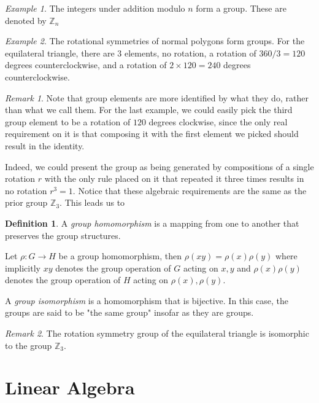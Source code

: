 \documentclass[12pt]{article}
\theoremstyle{definition}
\newtheorem{definition}{Definition}[section]
\theoremstyle{remark}
\newtheorem*{remark}{Remark}
\theoremstyle{example}
\newtheorem{example}{Example}
\begin{document}
\begin{example}
	The integers under addition modulo $n$ form a group. These are denoted by $\mathbb{Z}_n$
\end{example}

\begin{example}
	The rotational symmetries of normal polygons form groups. For the equilateral triangle, there are $3$ elements, no rotation, a rotation of $360/3=120$ degrees counterclockwise, and a rotation of $2\times 120=240$ degrees counterclockwise.
\end{example}
\begin{remark}
	Note that group elements are more identified by what they do, rather than what we call them. For the last example, we could easily pick the third group element to be a rotation of $120$ degrees clockwise, since the only real requirement on it is that composing it with the first element we picked should result in the identity.
	
	Indeed, we could present the group as being generated by compositions of a single rotation $r$ with the only rule placed on it that repeated it three times results in no rotation $r^3 = 1$. Notice that these algebraic requirements are the same as the prior group $\mathbb{Z}_3$. This leads us to
\end{remark}

\begin{definition}
	A \textit{group homomorphism} is a mapping from one to another that preserves the group structures.
	
	Let $\rho:G\to H$ be a group homomorphism, then $\rho(xy)=\rho(x)\rho(y)$ where implicitly $xy$ denotes the group operation of $G$ acting on $x,y$ and $\rho(x)\rho(y)$ denotes the group operation of $H$ acting on $\rho(x),\rho(y)$.
	
	A \textit{group isomorphism} is a homomorphism that is bijective. In this case, the groups are said to be "the same group" insofar as they are groups.
\end{definition}

\begin{remark}
	The rotation symmetry group of the equilateral triangle is isomorphic to the group $\mathbb{Z}_3$.
\end{remark}

\section{Linear Algebra}
\end{document}
